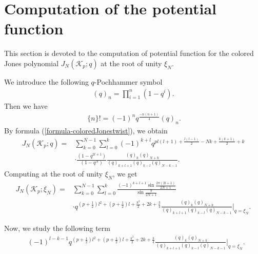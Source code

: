 \documentclass[12pt]{amsart}
\begin{document}
   

 




\section{Computation of the potential function} \label{section-potentialfunction}
This section is devoted to the computation of potential function for the colored 
Jones polynomial $J_{N}(\mathcal{K}_p;q)$ at the root of unity $\xi_N$. 

We introduce the following $q$-Pochhammer symbol
\begin{align}
    (q)_n=\prod_{i=1}^{n}(1-q^i).
\end{align}
Then we have
\begin{align}
\ \{n\}!=(-1)^nq^{\frac{-n(n+1)}{4}}(q)_n.
\end{align}
By formula (\ref{formula-coloredJonestwist}),  we obtain
\begin{align}
J_{N}(\mathcal{K}_p;q)
=&\sum_{k=0}^{N-1}\sum_{l=0}^k(-1)^{k+l}q^{pl(l+1)+\frac{l(l-1)}{2}-Nk+\frac{k(k+1)}{2}+k}\\\nonumber
&\cdot\frac{(1-q^{2l+1})}{(1-q^N)}\frac{(q)_k(q)_{N+k}}{(q)_{k+l+1}(q)_{k-l}(q)_{N-k-1}}. 
\end{align}
Computing at the root of unity $\xi_N$, we get   
\begin{align}  \label{formula-sumkl}
 J_{N}(\mathcal{K}_p;\xi_N)=&\sum_{k=0}^{N-1}\sum_{l=0}^k\frac{(-1)^{k+l+1}\sin \frac{2\pi(2l+1)}{2N+1}}{\sin \frac{\pi }{2N+1}}\\\nonumber
 &\cdot q^{(p+\frac{1}{2})l^2+(p+\frac{1}{2})l+\frac{k^2}{2}+2k+\frac{3}{4}}\frac{(q)_k(q)_{N+k}}{(q)_{k+l+1}(q)_{k-l}(q)_{N-k-1}}|_{q=\xi_N}. 
\end{align}




Now, we study the following term
\begin{align}
   &(-1)^{l-k-1}q^{(p+\frac{1}{2})l^2+(p+\frac{1}{2})l+\frac{k^2}{2}+2k+\frac{3}{4}}\frac{(q)_k(q)_{N+k}}{(q)_{k+l+1}(q)_{k-l}(q)_{N-k-1}}|_{q=\xi_N} .
\end{align}
\end{document}
